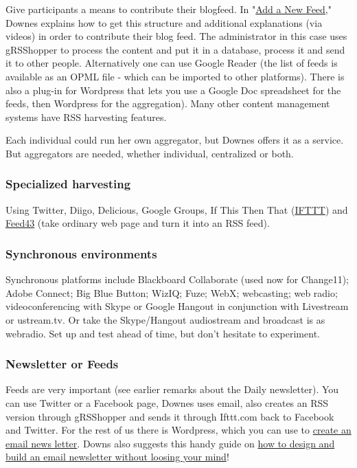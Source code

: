 Give participants a means to contribute their blogfeed. In
"\href{http://change.mooc.ca/new\_feed.htm}{Add a New Feed}," Downes
explains how to get this structure and additional explanations (via
videos) in order to contribute their blog feed. The administrator in
this case uses gRSShopper to process the content and put it in a
database, process it and send it to other people. Alternatively one can
use Google Reader (the list of feeds is available as an OPML file -
which can be imported to other platforms). There is also a plug-in for
Wordpress that lets you use a Google Doc spreadsheet for the feeds, then
Wordpress for the aggregation). Many other content management systems
have RSS harvesting features.

Each individual could run her own aggregator, but Downes offers it as a
service. But aggregators are needed, whether individual, centralized or
both.

\subsubsection{Specialized harvesting}

Using Twitter, Diigo, Delicious, Google Groups, If This Then That
(\href{http://ifttt.com}{IFTTT}) and \href{http://feed43.com}{Feed43}
(take ordinary web page and turn it into an RSS feed).

\subsubsection{Synchronous environments}

Synchronous platforms include Blackboard Collaborate (used now for
Change11); Adobe Connect; Big Blue Button; WizIQ; Fuze; WebX;
webcasting; web radio; videoconferencing with Skype or Google Hangout in
conjunction with Livestream or ustream.tv. Or take the Skype/Hangout
audiostream and broadcast is as webradio. Set up and test ahead of time,
but don't hesitate to experiment.

\subsubsection{Newsletter or Feeds}

Feeds are very important (see earlier remarks about the Daily
newsletter). You can use Twitter or a Facebook page, Downes uses email,
also creates an RSS version through gRSShopper and sends it through
Ifttt.com back to Facebook and Twitter. For the rest of us there is
Wordpress, which you can use to
\href{http://www.wpbeginner.com/wp-tutorials/create-a-free-email-newsletter-service-using-wordpress/\%20}{create
an email news letter}. Downs also suggests this handy guide on
\href{http://www.smashingmagazine.com/2010/01/19/design-and-build-an-email-newsletter-without-losing-your-mind/}{how
to design and build an email newsletter without loosing your mind}!

